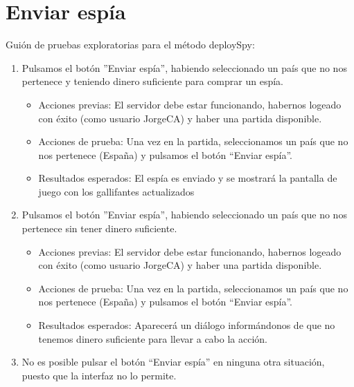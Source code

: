\section{Enviar espía}

Guión de pruebas exploratorias para el método deploySpy:

\begin{enumerate}
\item Pulsamos el botón ''Enviar espía'', habiendo seleccionado un país que no nos pertenece y teniendo dinero suficiente para comprar un espía.
	\begin{itemize}
	\item Acciones previas: El servidor debe estar funcionando, habernos logeado con éxito (como usuario JorgeCA) y haber una partida disponible.
	\item Acciones de prueba: Una vez en la  partida, seleccionamos un país que no nos pertenece (España) y pulsamos el botón ``Enviar espía''.     
	\item Resultados esperados: El espía es enviado y se mostrará la pantalla de juego con los gallifantes actualizados
	\end{itemize}
\item Pulsamos el botón ''Enviar espía'', habiendo seleccionado un país que no nos pertenece sin tener dinero suficiente.
	\begin{itemize}
	\item Acciones previas: El servidor debe estar funcionando, habernos logeado con éxito (como usuario JorgeCA) y haber una partida disponible.
	\item Acciones de prueba: Una vez en la  partida, seleccionamos un país que no nos pertenece (España) y pulsamos el botón ``Enviar espía''.     
	\item Resultados esperados: Aparecerá un diálogo informándonos de que no tenemos dinero suficiente para llevar a cabo la acción.
	\end{itemize}
\item No es posible pulsar el botón ``Enviar espía'' en ninguna otra situación, puesto que la interfaz no lo permite.

\end{enumerate}

